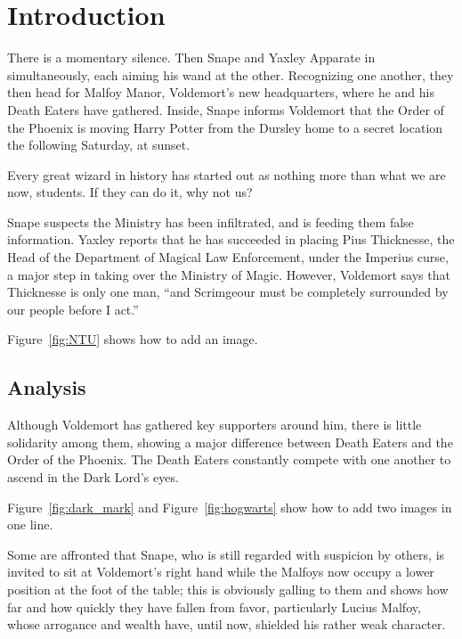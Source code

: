 \chapter{Introduction}
\label{chap:intro}
There is a momentary silence. Then Snape and Yaxley Apparate in simultaneously, each aiming his wand at the other. Recognizing one another, they then head for Malfoy Manor, Voldemort's new headquarters\cite{small}, where he and his Death Eaters have gathered. Inside, Snape informs Voldemort that the Order of the Phoenix is moving Harry Potter from the Dursley home to a secret location the following Saturday, at sunset.

\begin{ntuquote}%
Every great wizard in history has started out as nothing more than what we are now, students. If they can do it, why not us?%
\end{ntuquote}

Snape suspects the Ministry has been infiltrated, and is feeding them false information. Yaxley reports that he has succeeded in placing Pius Thicknesse, the Head of the Department of Magical Law Enforcement, under the Imperius curse, a major step in taking over the Ministry of Magic. However, Voldemort says that Thicknesse is only one man, ``and Scrimgeour must be completely surrounded by our people before I act.''

Figure~\ref{fig:NTU} shows how to add an image.

\section{Analysis}
Although Voldemort has gathered key supporters around him, there is little solidarity among them, showing a major difference between Death Eaters and the Order of the Phoenix. The Death Eaters constantly compete with one another to ascend in the Dark Lord's eyes.

Figure~\ref{fig:dark_mark} and Figure~\ref{fig:hogwarts} show how to add two images in one line.

Some are affronted that Snape, who is still regarded with suspicion by others, is invited to sit at Voldemort's right hand while the Malfoys now occupy a lower position at the foot of the table; this is obviously galling to them and shows how far and how quickly they have fallen from favor, particularly Lucius Malfoy, whose arrogance and wealth have, until now, shielded his rather weak character. 

